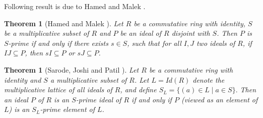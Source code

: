 \documentclass[10pt,twoside,a4]{amsart}
\numberwithin{equation}{section}
\theoremstyle{plain}
\newtheorem{thm}[lem]{Theorem}
\theoremstyle{definition}
\newtheorem{exa}[lem]{Example}
\newtheorem{rem}[lem]{Remark}
\begin{document}
		
		
			
		

		
		
	Following result is due to Hamed and Malek \cite{HM}.
		
	\begin{thm}[Hamed and Malek \cite{HM}] \label{1.20.}
	Let $R$ be a commutative ring with identity, $S $ be a multiplicative subset of $R$ and $P$ be an ideal of $R$ disjoint with $S$. Then $P$ is $S$-prime if and only if there exists $s \in S$, such that for all $I, J$ two ideals of $R$, if $IJ \subseteq P$, then $sI \subseteq P$ or $sJ \subseteq P$.
	\end{thm}
		
		
	\begin{thm}[Sarode, Joshi and Patil \cite{SJP}]
	Let $R$ be a commutative ring with identity and $S$ a multiplicative subset of $R$. Let $L=Id(R)$ denote the multiplicative lattice of all ideals of $R$, and define 
	$S_L=\{(a)\in L \mid a\in S\}.$ Then an ideal $P$ of $R$ is an $S$-prime ideal of $R$ if and only if $P$ (viewed as an element of $L$) is an $S_L$-prime element of $L$.
	\end{thm}
		
\end{document}
